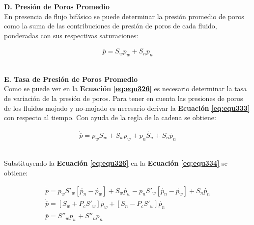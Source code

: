 \textbf{D. Presión de Poros Promedio}
\\
En presencia de flujo bifásico se puede determinar la presión promedio de poros como la suma de las contribuciones de presión de poros de cada fluido, ponderadas con sus respectivas saturaciones:

\begin{ceqn} 
\begin{gather} \label{eq:equ333} 
\overline{p} = S_w p_w + S_n p_n
\end{gather}  
\end{ceqn}
\\
\textbf{E. Tasa de Presión de Poros Promedio}
\\
Como se puede ver en la \textbf{Ecuación} \textbf{\ref{eq:equ326}} es necesario determinar la tasa de variación de la presión de poros. Para tener en cuenta las presiones de poros de los fluidos mojado y no-mojado es necesario derivar la \textbf{Ecuación} \textbf{\ref{eq:equ333}} con respecto al tiempo. Con ayuda de la regla de la cadena se obtiene:\bigskip

\begin{ceqn} 
\begin{gather} \label{eq:equ3324}
\dot{\overline{p}} = p_w\dot{S_w} + S_w\dot{p_w} + p_n\dot{S_n} + S_n\dot{p_n}
\end{gather}  
\end{ceqn}
\\
Substituyendo la \textbf{Ecuación} \textbf{\ref{eq:equ326}} en la \textbf{Ecuación} \textbf{\ref{eq:equ334}} se obtiene:

\begin{ceqn} 
\begin{subequations} \label{eq:equ335} 
\begin{gather}
\dot{\overline{p}} = p_w S'_w\left[\dot{p_n}-\dot{p_w}\right] + S_w\dot{p_w}  - p_n S'_w\left[\dot{p_n}-\dot{p_w}\right] + S_n\dot{p_n} \label{eq:equ335a} \\[12pt]
\dot{\overline{p}} = \left[S_w + P_c S'_w\right]\dot{p_w} + \left[S_n - P_c S'_w\right]\dot{p_n}  \label{eq:equ335b} \\[12pt]
\dot{\overline{p}} = S''_w\dot{p_w} + S''_n\dot{p_n}  \label{eq:equ335c}
\end{gather}  
\end{subequations} 
\end{ceqn}
\bigskip

